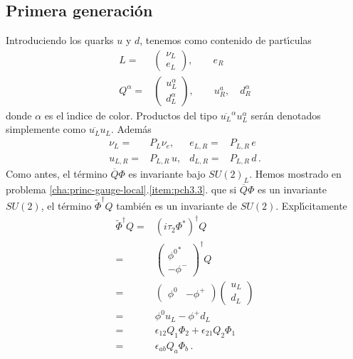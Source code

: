 \subsection{Primera generaci\'on}
\label{sec:una-generacion}
Introduciendo los quarks $u$ y $d$, tenemos como contenido de part\'\i culas
\begin{align}
  L=&\begin{pmatrix}
    \nu_L\\
    e_L
  \end{pmatrix},\qquad e_R\nonumber\\
  Q^\alpha=&\begin{pmatrix}
    u_L^\alpha\\
    d_L^\alpha
  \end{pmatrix},\qquad u_R^a,\quad d_R^\alpha
\end{align}
donde $\alpha$ es el \'\i ndice de color. Productos del tipo $\overline{u_L}^\alpha u_L^\alpha$ ser\'an denotados simplemente como $\overline{u_L}u_L$. Adem\'as 
\begin{align}
  \nu_L=&P_L\nu_e,& e_{L,R}=&P_{L,R}\,e\nonumber\\
  u_{L,R}=&P_{L,R}\,u,& d_{L,R}=&P_{L,R}\,d\,.
\end{align}
Como antes, el t\'ermino $\overline{Q}\Phi$ es invariante bajo $SU(2)_L$. Hemos mostrado en problema \ref{cha:princ-gauge-local}.\ref{item:pch3.3}. que si
$\overline{Q}\Phi$ es un invariante $SU(2)$, el t\'ermino ${\tilde \Phi}^\dagger Q$ tambi\'en es un invariante de $SU(2)$. Expl\'\i citamente
\begin{align}
  \widetilde{\Phi}^\dagger Q=&(i\tau_2\Phi^*)^\dagger Q\nonumber\\
  =& \begin{pmatrix}
    {\phi^0}^*\\
    -\phi^-    
  \end{pmatrix}^\dagger Q\nonumber\\
  =&\begin{pmatrix}
    \phi^0 & -\phi^+
  \end{pmatrix}\begin{pmatrix}
    u_L\\
    d_L
  \end{pmatrix}\nonumber\\
  =&\phi^0 u_L - \phi^+ d_L\nonumber\\
  =&\epsilon_{12}Q_1\Phi_2+\epsilon_{21}Q_2\Phi_1\nonumber\\
  =&\epsilon_{ab}Q_a \Phi_b\,.
\end{align}
